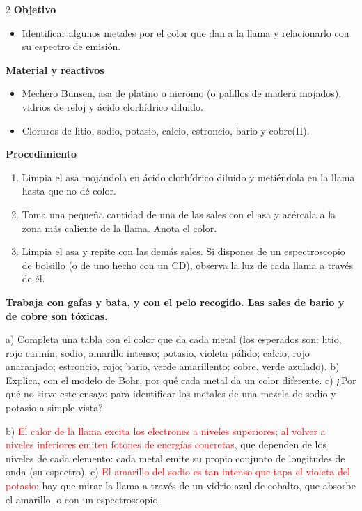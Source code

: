 \begin{multicols}{2}
    \textbf{Objetivo}
    \begin{itemize}
        \item Identificar algunos metales por el color que dan a la llama y relacionarlo con su espectro de emisión.
    \end{itemize}
    \columnbreak
    \textbf{Material y reactivos}
    \begin{itemize}
        \item Mechero Bunsen, asa de platino o nicromo (o palillos de madera mojados), vidrios de reloj y ácido clorhídrico diluido.
        \item Cloruros de litio, sodio, potasio, calcio, estroncio, bario y cobre(II).
    \end{itemize}
\end{multicols}

\textbf{Procedimiento}
\begin{enumerate}[label=\numberballgreen]
    \item Limpia el asa mojándola en ácido clorhídrico diluido y metiéndola en la llama hasta que no dé color.
    \item Toma una pequeña cantidad de una de las sales con el asa y acércala a la zona más caliente de la llama. Anota el color.
    \item Limpia el asa y repite con las demás sales. Si dispones de un espectroscopio de bolsillo (o de uno hecho con un CD),
    observa la luz de cada llama a través de él.
\end{enumerate}
\textbf{Trabaja con gafas y bata, y con el pelo recogido. Las sales de bario y de cobre son tóxicas.}

\begin{exercise}
    a) Completa una tabla con el color que da cada metal (los esperados son: litio, rojo carmín; sodio, amarillo intenso;
    potasio, violeta pálido; calcio, rojo anaranjado; estroncio, rojo; bario, verde amarillento; cobre, verde azulado).
    b) Explica, con el modelo de Bohr, por qué cada metal da un color diferente. c) ¿Por qué no sirve este ensayo para identificar
    los metales de una mezcla de sodio y potasio a simple vista?
    \begin{solu}
        b) \textcolor{red}{El calor de la llama excita los electrones a niveles superiores; al volver a niveles inferiores emiten
        fotones de energías concretas}, que dependen de los niveles de cada elemento: cada metal emite su propio conjunto de
        longitudes de onda (su espectro). c) \textcolor{red}{El amarillo del sodio es tan intenso que tapa el violeta del potasio};
        hay que mirar la llama a través de un vidrio azul de cobalto, que absorbe el amarillo, o con un espectroscopio.
    \end{solu}
\end{exercise}


